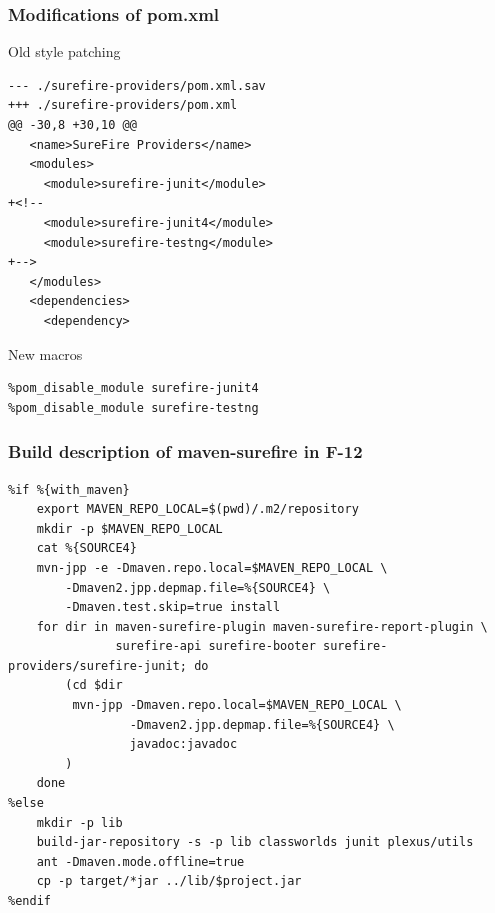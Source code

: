 \documentclass[pdftex,unicode,xcolor=table]{beamer}
\begin{document}
\begin{frame}[fragile]
  \scriptsize
\frametitle{Modifications of pom.xml}
  \begin{block}{Old style patching}
\begin{verbatim}
--- ./surefire-providers/pom.xml.sav
+++ ./surefire-providers/pom.xml
@@ -30,8 +30,10 @@
   <name>SureFire Providers</name>
   <modules>
     <module>surefire-junit</module>
+<!--
     <module>surefire-junit4</module>
     <module>surefire-testng</module>
+-->
   </modules>
   <dependencies>
     <dependency>
\end{verbatim}
\end{block}

  \begin{block}{New macros}
\begin{verbatim}
%pom_disable_module surefire-junit4
%pom_disable_module surefire-testng
\end{verbatim}
\end{block}

\end{frame}


\begin{frame}[fragile]
  \frametitle{Build description of maven-surefire in F-12}
  \scriptsize
  \begin{verbatim}
%if %{with_maven}
    export MAVEN_REPO_LOCAL=$(pwd)/.m2/repository
    mkdir -p $MAVEN_REPO_LOCAL
    cat %{SOURCE4}
    mvn-jpp -e -Dmaven.repo.local=$MAVEN_REPO_LOCAL \
        -Dmaven2.jpp.depmap.file=%{SOURCE4} \
        -Dmaven.test.skip=true install
    for dir in maven-surefire-plugin maven-surefire-report-plugin \
               surefire-api surefire-booter surefire-providers/surefire-junit; do
        (cd $dir
         mvn-jpp -Dmaven.repo.local=$MAVEN_REPO_LOCAL \
                 -Dmaven2.jpp.depmap.file=%{SOURCE4} \
                 javadoc:javadoc
        )
    done
%else
    mkdir -p lib
    build-jar-repository -s -p lib classworlds junit plexus/utils
    ant -Dmaven.mode.offline=true
    cp -p target/*jar ../lib/$project.jar
%endif
  \end{verbatim}
  \note{Note!}
\end{frame}
\end{document}
